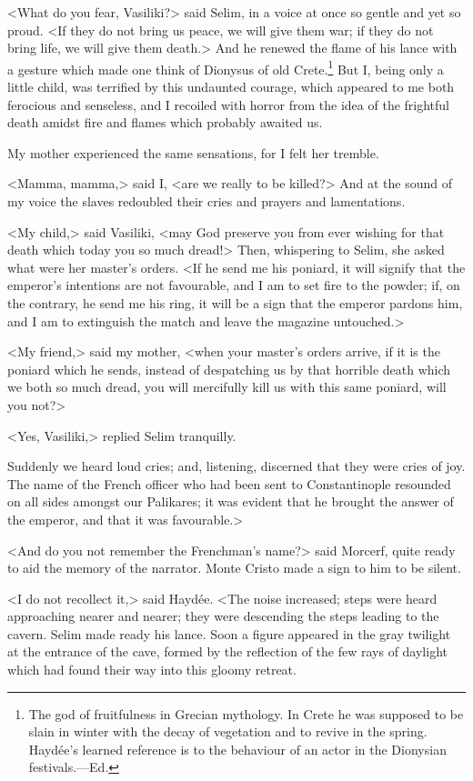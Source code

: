  <What do you fear, Vasiliki?> said Selim, in a voice at once so gentle and yet so proud. <If they do not bring us peace, we will give them war; if they do not bring life, we will give them death.> And he renewed the flame of his lance with a gesture which made one think of Dionysus of old Crete.\footnote{The god of fruitfulness in Grecian mythology. In Crete he was supposed to be slain in winter with the decay of vegetation and to revive in the spring. Haydée's learned reference is to the behaviour of an actor in the Dionysian festivals.—Ed.} But I, being only a little child, was terrified by this undaunted courage, which appeared to me both ferocious and senseless, and I recoiled with horror from the idea of the frightful death amidst fire and flames which probably awaited us. 

My mother experienced the same sensations, for I felt her tremble. 

<Mamma, mamma,> said I, <are we really to be killed?> And at the sound of my voice the slaves redoubled their cries and prayers and lamentations. 

<My child,> said Vasiliki, <may God preserve you from ever wishing for that death which today you so much dread!> Then, whispering to Selim, she asked what were her master's orders. <If he send me his poniard, it will signify that the emperor's intentions are not favourable, and I am to set fire to the powder; if, on the contrary, he send me his ring, it will be a sign that the emperor pardons him, and I am to extinguish the match and leave the magazine untouched.>

<My friend,> said my mother, <when your master's orders arrive, if it is the poniard which he sends, instead of despatching us by that horrible death which we both so much dread, you will mercifully kill us with this same poniard, will you not?>

<Yes, Vasiliki,> replied Selim tranquilly. 

Suddenly we heard loud cries; and, listening, discerned that they were cries of joy. The name of the French officer who had been sent to Constantinople resounded on all sides amongst our Palikares; it was evident that he brought the answer of the emperor, and that it was favourable.> 

 <And do you not remember the Frenchman's name?> said Morcerf, quite ready to aid the memory of the narrator. Monte Cristo made a sign to him to be silent. 

 <I do not recollect it,> said Haydée. <The noise increased; steps were heard approaching nearer and nearer; they were descending the steps leading to the cavern. Selim made ready his lance. Soon a figure appeared in the gray twilight at the entrance of the cave, formed by the reflection of the few rays of daylight which had found their way into this gloomy retreat. 
 
